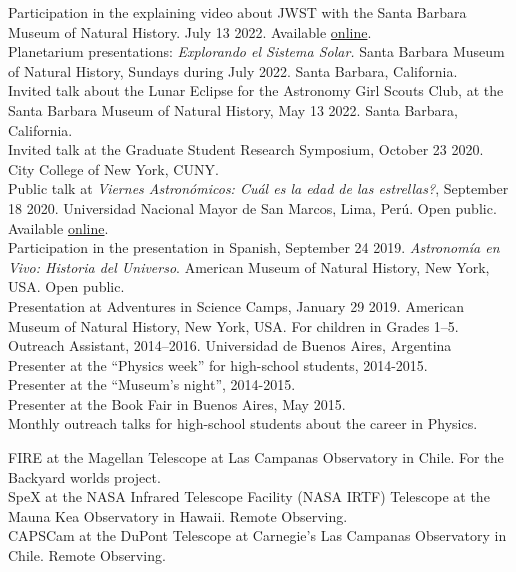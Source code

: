 \documentclass[10pt]{cv}
\newcommand\tab[1][1cm]{\hspace*{#1}}
\begin{document}
\begin{llist}

Participation in the explaining video about JWST with the Santa Barbara Museum of Natural History. July 13 2022. Available \href{https://www.youtube.com/watch?v=LV8N0OSEJOg}{online}.\\
Planetarium presentations: \textit{Explorando el Sistema Solar.} Santa Barbara Museum of Natural History, Sundays during July 2022. Santa Barbara, California. \\
Invited talk about the Lunar Eclipse for the Astronomy Girl Scouts Club, at the Santa Barbara Museum of Natural History, May 13 2022. Santa Barbara, California. \\
Invited talk at the Graduate Student Research Symposium, October 23 2020. City College of New York, CUNY.	\\
Public talk at \textit{Viernes Astron\'omicos: Cu\'al es la edad de las estrellas?}, September 18 2020. Universidad Nacional Mayor de San Marcos, Lima, Per\'u. Open public. Available \href{https://www.youtube.com/watch?v=QOlgG1b41hU&ab_channel=AstronomySanMarcos}{online}.\\
Participation in the presentation in Spanish, September 24 2019. \textit{Astronom\'ia en Vivo: Historia del Universo}. American Museum of Natural History, New York, USA. Open public.\\
Presentation at Adventures in Science Camps, January 29 2019. American Museum of Natural History, New York, USA. For children in Grades 1--5.\\
Outreach Assistant, 2014--2016. Universidad de Buenos Aires, Argentina\\
\tab Presenter at the ``Physics week'' for high-school students, 2014-2015.\\
\tab Presenter at the ``­Museum's night'', 2014-2015.\\
\tab Presenter at the Book Fair in Buenos Aires, May 2015.\\
\tab Monthly outreach talks for high-school students about the career in Physics.


FIRE at the Magellan Telescope at Las Campanas Observatory
 in Chile. For the Backyard worlds project. \\
SpeX at the NASA Infrared Telescope Facility (NASA IRTF) 	
Telescope at the Mauna Kea Observatory in Hawaii. Remote Observing. \\
CAPSCam at the DuPont Telescope	
at Carnegie's Las Campanas Observatory in Chile. Remote Observing.




\end{llist}
\end{document}
